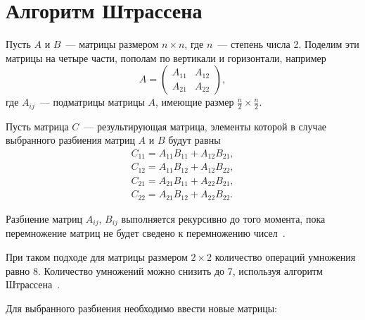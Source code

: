 \section{Алгоритм Штрассена}

Пусть $A$ и $B$~--- матрицы размером $n \times n$, где $n$~--- степень числа 2.
Поделим эти матрицы на четыре части, пополам по вертикали и горизонтали, например
\begin{equation}
    \label{eqn:mat-split}
    A = 
    \begin{pmatrix}
        A_{11} & A_{12}\\
        A_{21} & A_{22}
    \end{pmatrix},
\end{equation}
где $A_{ij}$~--- подматрицы матрицы $A$, имеющие размер $\frac{n}{2} \times \frac{n}{2}$.

Пусть матрица $C$~--- результирующая матрица, элементы которой в случае выбранного разбиения матриц $A$ и $B$ будут равны
\begin{equation}
    \label{eqn:c-mat-from-split}
    \begin{aligned}
        C_{11} = A_{11}B_{11} + A_{12}B_{21},\\
        C_{12} = A_{11}B_{12} + A_{12}B_{22},\\
        C_{21} = A_{21}B_{11} + A_{22}B_{21},\\
        C_{22} = A_{21}B_{12} + A_{22}B_{22}.
    \end{aligned}
\end{equation}

Разбиение матриц $A_{ij}$, $B_{ij}$ выполняется рекурсивно до того момента, пока перемножение матриц не будет сведено к перемножению чисел~\cite{strassen-lect}.

При таком подходе для матрицы размером $2 \times 2$ количество операций умножения равно 8.
Количество умножений можно снизить до 7, используя алгоритм Штрассена~\cite{strassen-elib}.

Для выбранного разбиения необходимо ввести новые матрицы:

